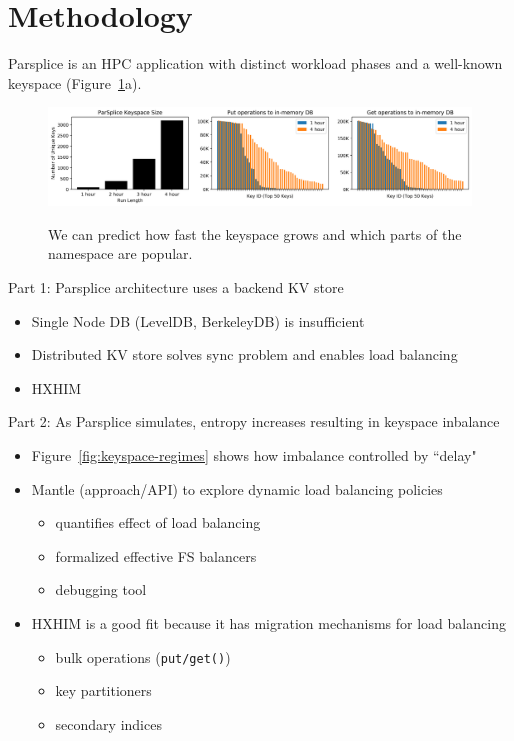 \section{Methodology}

Parsplice is an HPC application with distinct workload phases and a well-known keyspace (Figure~\ref{fig:scale-length}a).
\begin{figure}[tbh]
  \noindent\includegraphics[width=1\textwidth]{figures/scale-length.png}\\
  \caption{We can predict how fast the keyspace grows and which parts of the
  namespace are popular.\label{fig:scale-length}}
\end{figure}

Part 1: Parsplice architecture uses a backend KV store
\begin{itemize}
  \item Single Node DB (LevelDB, BerkeleyDB) is insufficient
  \item Distributed KV store solves sync problem and enables load balancing
  \item HXHIM 
\end{itemize}

Part 2: As Parsplice simulates, entropy increases resulting in keyspace inbalance
\begin{itemize}
  \item Figure~\ref{fig:keyspace-regimes} shows how imbalance controlled by ``delay"
  \item Mantle (approach/API) to explore dynamic load balancing policies
  \begin{itemize}
    \item quantifies effect of load balancing
    \item formalized effective FS balancers
    \item debugging tool 
  \end{itemize}
  \item HXHIM is a good fit because it has migration mechanisms for load balancing
  \begin{itemize}
    \item bulk operations (\texttt{put/get()})
    \item key partitioners
    \item secondary indices
  \end{itemize}
\end{itemize}

